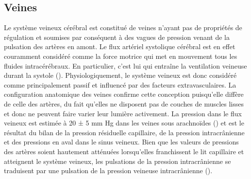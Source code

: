 \subsection{Veines }
Le système veineux cérébral est constitué de veines n’ayant pas de propriétés de régulation et
soumises par conséquent à des vagues de pression venant de la pulsation des artères en amont. Le
flux artériel systolique cérébral est en effet couramment considéré comme la force motrice qui met en
mouvement tous les fluides intracérébraux. En particulier, c’est lui qui entraîne la ventilation veineuse
durant la systole (\cite{Greitz1992}). Physiologiquement, le système veineux est donc considéré comme
principalement passif et influencé par des facteurs extravasculaires. La configuration anatomique des
veines confirme cette conception puisqu’elle diffère de celle des artères, du fait qu’elles ne disposent
pas de couches de muscles lisses et donc ne peuvent faire varier leur lumière activement. La pression
dans le flux veineux est estimée à 20 ± 5 mm Hg dans les veines sous arachnoïdes (\cite{Ekstedt1978}) et est le résultat
du bilan de la pression résiduelle capillaire, de la pression intracrânienne et des pressions en aval dans
le sinus veineux. Bien que les valeurs de pressions des artères soient hautement atténuées lorsqu’elles
franchissent le lit capillaire et atteignent le système veineux, les pulsations de la pression
intracrânienne se traduisent par une pulsation de la pression veineuse intracrânienne (\cite{Elsankari2012}).
